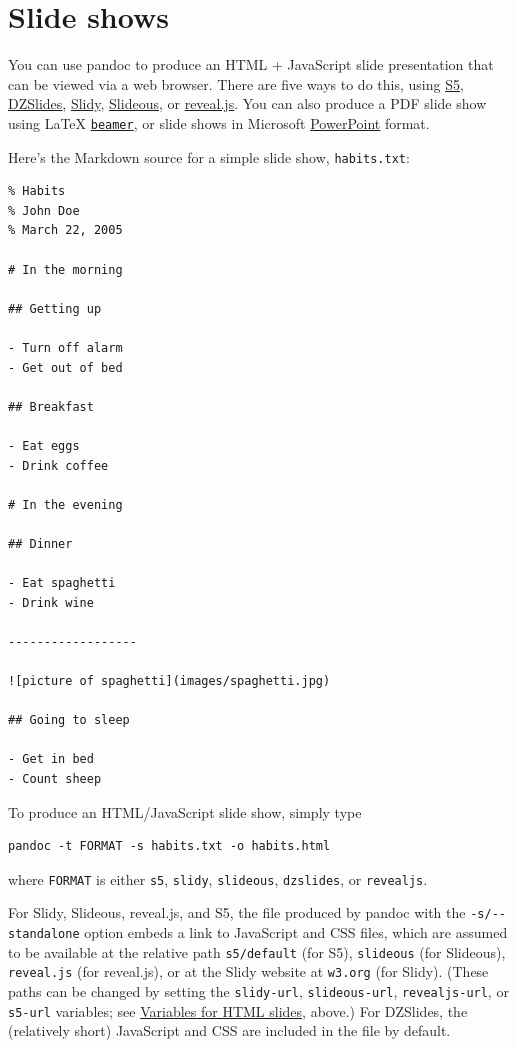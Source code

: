 \documentclass[
]{article}
\begin{document}
\hypertarget{slide-shows}{%
\section{Slide shows}\label{slide-shows}}

You can use pandoc to produce an HTML + JavaScript slide presentation
that can be viewed via a web browser. There are five ways to do this,
using \href{https://meyerweb.com/eric/tools/s5/}{S5},
\href{https://paulrouget.com/dzslides/}{DZSlides},
\href{https://www.w3.org/Talks/Tools/Slidy2/}{Slidy},
\href{https://goessner.net/articles/slideous/}{Slideous}, or
\href{https://revealjs.com/}{reveal.js}. You can also produce a PDF
slide show using LaTeX
\href{https://ctan.org/pkg/beamer}{\texttt{beamer}}, or slide shows in
Microsoft
\href{https://en.wikipedia.org/wiki/Microsoft_PowerPoint}{PowerPoint}
format.

Here's the Markdown source for a simple slide show, \texttt{habits.txt}:

\begin{verbatim}
% Habits
% John Doe
% March 22, 2005

# In the morning

## Getting up

- Turn off alarm
- Get out of bed

## Breakfast

- Eat eggs
- Drink coffee

# In the evening

## Dinner

- Eat spaghetti
- Drink wine

------------------

![picture of spaghetti](images/spaghetti.jpg)

## Going to sleep

- Get in bed
- Count sheep
\end{verbatim}

To produce an HTML/JavaScript slide show, simply type

\begin{verbatim}
pandoc -t FORMAT -s habits.txt -o habits.html
\end{verbatim}

where \texttt{FORMAT} is either \texttt{s5}, \texttt{slidy},
\texttt{slideous}, \texttt{dzslides}, or \texttt{revealjs}.

For Slidy, Slideous, reveal.js, and S5, the file produced by pandoc with
the \texttt{-s/-\/-standalone} option embeds a link to JavaScript and
CSS files, which are assumed to be available at the relative path
\texttt{s5/default} (for S5), \texttt{slideous} (for Slideous),
\texttt{reveal.js} (for reveal.js), or at the Slidy website at
\texttt{w3.org} (for Slidy). (These paths can be changed by setting the
\texttt{slidy-url}, \texttt{slideous-url}, \texttt{revealjs-url}, or
\texttt{s5-url} variables; see
\protect\hyperlink{variables-for-html-slides}{Variables for HTML
slides}, above.) For DZSlides, the (relatively short) JavaScript and CSS
are included in the file by default.
\end{document}
